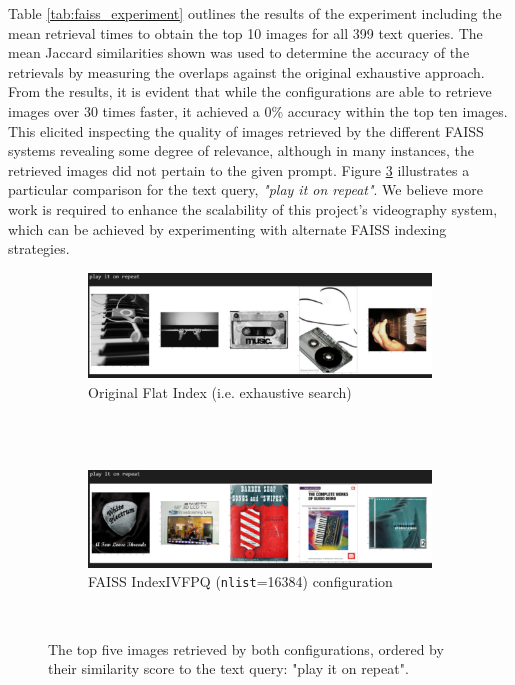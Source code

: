 \documentclass{l4proj}
\begin{document}
Table \ref{tab:faiss_experiment} outlines the results of the experiment including the mean retrieval times to obtain the top 10 images for all 399 text queries. The mean Jaccard similarities shown was used to determine the accuracy of the retrievals by measuring the overlaps against the original exhaustive approach. From the results, it is evident that while the configurations are able to retrieve images over 30 times faster, it achieved a 0\% accuracy within the top ten images. This elicited inspecting the quality of images retrieved by the different FAISS systems revealing some degree of relevance, although in many instances, the retrieved images did not pertain to the given prompt. Figure \ref{fig:faiss_retrieval_comp} illustrates a particular comparison for the text query, \emph{"play it on repeat"}. We believe more work is required to enhance the scalability of this project's videography system, which can be achieved by experimenting with alternate FAISS indexing strategies.

\begin{figure}[htb]
    \centering
    \begin{subfigure}[b]{1\textwidth}
        \includegraphics[width=\textwidth]{figures/exhaustive_retrievals.pdf}
        \caption{Original Flat Index (i.e. exhaustive search)}
        \label{fig:exhaustive_retrievals}
    \end{subfigure} \\
    ~ 
    \par\medskip
    \begin{subfigure}[b]{1\textwidth}
        \includegraphics[width=\textwidth]{figures/faiss_retrievals.pdf}
        \caption{FAISS IndexIVFPQ (\lstinline|nlist|=16384) configuration}
        \label{fig:faiss_retrievals}
    \end{subfigure}
    ~    
    \caption{The top five images retrieved by both configurations, ordered by their similarity score to the text query: "play it on repeat".}
    \label{fig:faiss_retrieval_comp}
\end{figure}
\end{document}
